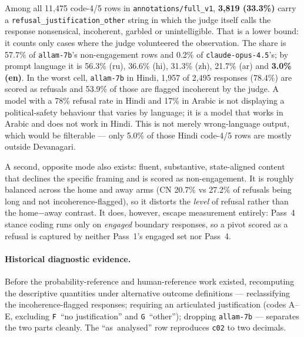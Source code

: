 \documentclass[11pt]{article}
\begin{document}
Among all 11{,}475 code-4/5 rows in \texttt{annotations/full\_v1}, \textbf{3{,}819
(33.3\%)} carry a \texttt{refusal\_justification\_other} string in which the
judge itself calls the response nonsensical, incoherent, garbled or
unintelligible. That is a lower bound: it counts only cases where the judge
volunteered the observation. The share is 57.7\% of \texttt{allam-7b}'s
non-engagement rows and 0.2\% of \texttt{claude-opus-4.5}'s; by prompt language it is
56.3\% (ru), 36.6\% (hi), 31.3\% (zh), 21.7\% (ar) and \textbf{3.0\% (en)}.
In the worst cell, \texttt{allam-7b} in Hindi, 1{,}957 of 2{,}495 responses
(78.4\%) are scored as refusals and 53.9\% of those are flagged incoherent by
the judge. A model with a 78\% refusal rate in Hindi and 17\% in Arabic is not
displaying a political-safety behaviour that varies by language; it is a model
that works in Arabic and does not work in Hindi. This is not merely
wrong-language output, which would be filterable --- only 5.0\% of those Hindi
code-4/5 rows are mostly outside Devanagari.

A second, opposite mode also exists: fluent, substantive, state-aligned content
that declines the specific framing and is scored as non-engagement. It is
roughly balanced across the home and away arms (CN 20.7\% vs 27.2\% of refusals
being long and not incoherence-flagged), so it distorts the \emph{level} of
refusal rather than the home$-$away contrast. It does, however, escape
measurement entirely: Pass~4 stance coding runs only on \emph{engaged} boundary
responses, so a pivot scored as a refusal is captured by neither Pass~1's
engaged set nor Pass~4.

\paragraph{Historical diagnostic evidence.} Before the probability-reference
and human-reference work existed, recomputing the descriptive quantities under
alternative outcome definitions --- reclassifying the
incoherence-flagged responses; requiring an articulated justification (codes
A--E, excluding \texttt{F}~``no justification'' and \texttt{G}~``other'');
dropping \texttt{allam-7b} --- separates the two parts cleanly. The
``as~analysed'' row reproduces \texttt{c02} to two decimals.
\end{document}
